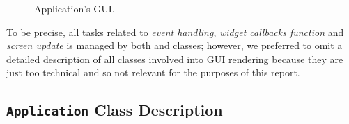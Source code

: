 \documentclass[sigconf]{acmart}
\begin{document}
\begin{figure}[h!]
    \centering
    \qquad
    \caption{Application's GUI.}%
    \label{CodeCellOutput}%
\end{figure}

To be precise, all tasks related to \textit{event handling}, \textit{widget callbacks function} and \textit{screen update} is managed by both  and  classes; however, we preferred to omit a detailed description of all classes involved into GUI rendering because they are just too technical and so not relevant for the purposes of this report. 

\subsection{\texttt{Application} Class Description}
\end{document}

